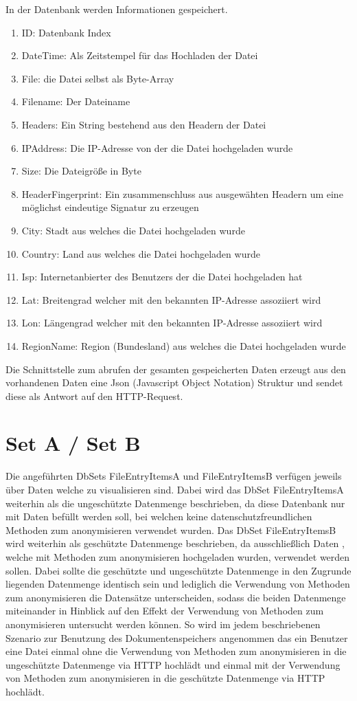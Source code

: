 \documentclass[
    fontsize=12pt,
    headings=small,
    parskip=half,           %
    bibliography=totoc,
    numbers=noenddot,       %
    open=any,               %
    ]{scrreprt}
\begin{document}
In der Datenbank werden Informationen gespeichert. 
\begin{enumerate}
\item ID: Datenbank Index
\item DateTime: Als Zeitstempel für das Hochladen der Datei
\item File: die Datei selbst als Byte-Array
\item Filename: Der Dateiname
\item Headers: Ein String bestehend aus den Headern der Datei
\item IPAddress: Die IP-Adresse von der die Datei hochgeladen wurde
\item Size: Die Dateigröße in Byte
\item HeaderFingerprint: Ein zusammenschluss aus ausgewähten Headern um eine möglichst eindeutige Signatur zu erzeugen
\item City: Stadt aus welches die Datei hochgeladen wurde
\item Country: Land aus welches die Datei hochgeladen wurde
\item Isp: Internetanbierter des Benutzers der die Datei hochgeladen hat
\item Lat: Breitengrad welcher mit den bekannten IP-Adresse assoziiert wird
\item Lon: Längengrad welcher mit den bekannten IP-Adresse assoziiert wird
\item RegionName: Region (Bundesland) aus welches die Datei hochgeladen wurde
\end{enumerate}

Die Schnittstelle zum abrufen der gesamten gespeicherten Daten erzeugt aus den vorhandenen Daten eine Json (Javascript Object Notation) Struktur und sendet diese als Antwort auf den HTTP-Request. 

\section{Set A / Set B}

Die angeführten DbSets FileEntryItemsA und FileEntryItemsB verfügen jeweils über Daten welche zu visualisieren sind. Dabei wird das DbSet FileEntryItemsA weiterhin als die ungeschützte Datenmenge beschrieben, da diese Datenbank nur mit Daten befüllt werden soll, bei welchen keine datenschutzfreundlichen Methoden zum anonymisieren verwendet wurden. Das DbSet FileEntryItemsB wird weiterhin als geschützte Datenmenge beschrieben, da ausschließlich Daten , welche mit Methoden zum anonymisieren hochgeladen wurden, verwendet werden sollen. Dabei sollte die geschützte und ungeschützte Datenmenge in den Zugrunde liegenden Datenmenge identisch sein und lediglich die Verwendung von Methoden zum anonymisieren die Datensätze unterscheiden, sodass die beiden Datenmenge miteinander in Hinblick auf den Effekt der Verwendung von Methoden zum anonymisieren untersucht werden können. 
So wird im jedem beschriebenen Szenario zur Benutzung des Dokumentenspeichers angenommen das ein Benutzer eine Datei einmal ohne die Verwendung von Methoden zum anonymisieren in die ungeschützte Datenmenge via HTTP hochlädt und einmal mit der Verwendung von Methoden zum anonymisieren in die geschützte Datenmenge via HTTP hochlädt.
\end{document}
